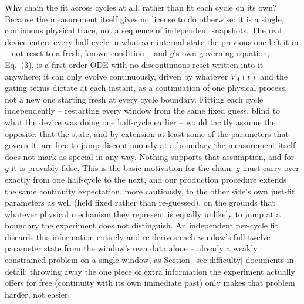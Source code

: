 \documentclass[11pt]{article}
\begin{document}
Why chain the fit across cycles at all, rather than fit each cycle on its
own? Because the measurement itself gives no license to do otherwise: it
is a single, continuous physical trace, not a sequence of independent
snapshots. The real device enters every half-cycle in whatever internal
state the previous one left it in -- not reset to a fresh, known
condition -- and $g$'s own governing equation, Eq.~(3), is a first-order
ODE with no discontinuous reset written into it anywhere; it can only
evolve continuously, driven by whatever $V_A(t)$ and the gating terms
dictate at each instant, as a continuation of one physical process, not a
new one starting fresh at every cycle boundary. Fitting each cycle
independently -- restarting every window from the same fixed guess,
blind to what the device was doing one half-cycle earlier -- would
tacitly assume the opposite: that the state, and by extension at least
some of the parameters that govern it, are free to jump discontinuously
at a boundary the measurement itself does not mark as special in any way.
Nothing supports that assumption, and for $g$ it is provably false. This
is the basic motivation for the chain: $g$ must carry over exactly from
one half-cycle to the next, and our production procedure extends the same
continuity expectation, more cautiously, to the other side's own
just-fit parameters as well (held fixed rather than re-guessed), on the
grounds that whatever physical mechanism they represent is equally
unlikely to jump at a boundary the experiment does not distinguish.
An independent per-cycle fit discards this information entirely and
re-derives each window's full twelve-parameter state from the window's
own data alone -- already a weakly constrained problem on a single window,
as Section~\ref{sec:difficulty} documents in detail; throwing away the one
piece of extra information the experiment actually offers for free
(continuity with its own immediate past) only makes that problem harder,
not easier.
\end{document}
